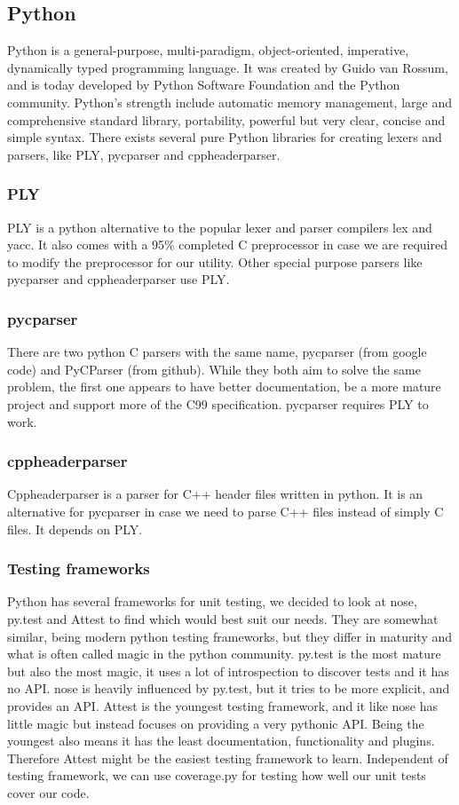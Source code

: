 \subsection{Python}
Python is a general-purpose, multi-paradigm, object-oriented, imperative,
dynamically typed programming language. It was created by Guido van Rossum,
and is today developed by Python Software Foundation and the Python community.
Python’s strength include automatic memory management, large and comprehensive
standard library, portability, powerful but very clear, concise and simple
syntax. There exists several pure Python libraries for creating lexers and
parsers, like PLY, pycparser and cppheaderparser.

\subsubsection{PLY}
PLY is a python alternative to the popular lexer and parser compilers lex and
yacc. It also comes with a 95\% completed C preprocessor in case we are
required to modify the preprocessor for our utility. Other special purpose
parsers like pycparser and cppheaderparser use PLY.

\subsubsection{pycparser}
There are two python C parsers with the same name, pycparser (from google code)
and PyCParser (from github). While they both aim to solve the same problem, the
first one appears to have better documentation, be a more mature project and
support more of the C99 specification. pycparser requires PLY to work.

\subsubsection{cppheaderparser}
Cppheaderparser is a parser for C++ header files written in python. It is an
alternative for pycparser in case we need to parse C++ files instead of simply
C files. It depends on PLY.

\subsubsection{Testing frameworks}
Python has several frameworks for unit testing, we decided to look at nose,
py.test and Attest to find which would best suit our needs. They are somewhat
similar, being modern python testing frameworks, but they differ in maturity
and what is often called magic in the python community. py.test is the most
mature but also the most magic, it uses a lot of introspection to discover
tests and it has no API. nose is heavily influenced by py.test, but it tries to
be more explicit, and provides an API. Attest is the youngest testing
framework, and it like nose has little magic but instead focuses on providing
a very pythonic API. Being the youngest also means it has the least
documentation, functionality and plugins. Therefore Attest might be the easiest
testing framework to learn. Independent of testing framework, we can use
coverage.py for testing how well our unit tests cover our code.

